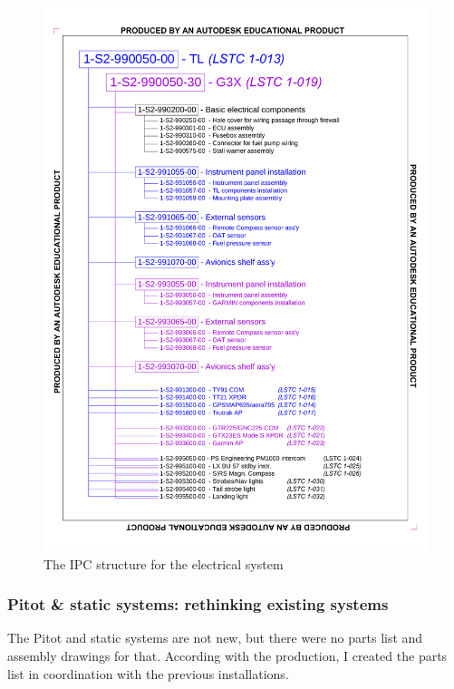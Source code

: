\documentclass[11pt,a4paper]{article}
\begin{document}
\begin{figure}[ht!]
	\begin{center}
		\includegraphics[width=15cm,trim = 1.9cm 2.4cm 1.9cm 2.4cm, clip]{pics/PIC015.pdf}
		\caption{The IPC structure for the electrical system}
		\label{fig:PIC015}
	\end{center}
\end{figure}

\newpage

\subsubsection{Pitot \& static systems: rethinking existing systems}

The Pitot and static systems are not new, but there were no parts list and assembly drawings for that. According with the production, I created the parts list in coordination with the previous installations.
\end{document}
